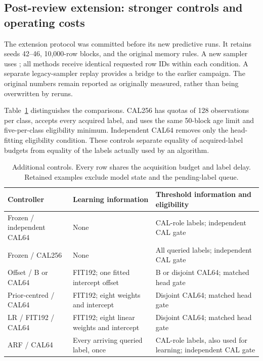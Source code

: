 \subsection{Post-review extension: stronger controls and operating costs}
\label{sec:extensiondesign}
The extension protocol was committed before its new predictive runs. It retains seeds 42--46, 10,000-row blocks, and the original memory rules. A new sampler uses ; all methods receive identical requested row IDs within each condition. A separate legacy-sampler replay provides a bridge to the earlier campaign. The original numbers remain reported as originally measured, rather than being overwritten by reruns.

Table~\ref{tab:extensiondesign} distinguishes the comparisons. CAL256 has quotas of 128 observations per class, accepts every acquired label, and uses the same 50-block age limit and five-per-class eligibility minimum. Independent CAL64 removes only the head-fitting eligibility condition. These controls separate equality of acquired-label budgets from equality of the labels actually used by an algorithm.

\begin{table}[tb]
\centering\small
\caption{Additional controls. Every row shares the acquisition budget and label delay. Retained examples exclude model state and the pending-label queue.}
\label{tab:extensiondesign}
\begin{tabularx}{\linewidth}{lXX}
\toprule
Controller & Learning information & Threshold information and eligibility \\
\midrule
Frozen / independent CAL64 & None & CAL-role labels; independent CAL gate \\
Frozen / CAL256 & None & All queried labels; independent CAL gate \\
Offset / B or CAL64 & FIT192; one fitted intercept offset & B or disjoint CAL64; matched head gate \\
Prior-centred / CAL64 & FIT192; eight weights and intercept & Disjoint CAL64; matched head gate \\
LR / FIT192 / CAL64 & FIT192; eight linear weights and intercept & Disjoint CAL64; matched head gate \\
ARF / CAL64 & Every arriving queried label, once & CAL-role labels, also used for learning; independent CAL gate \\
\bottomrule
\end{tabularx}
\end{table}

